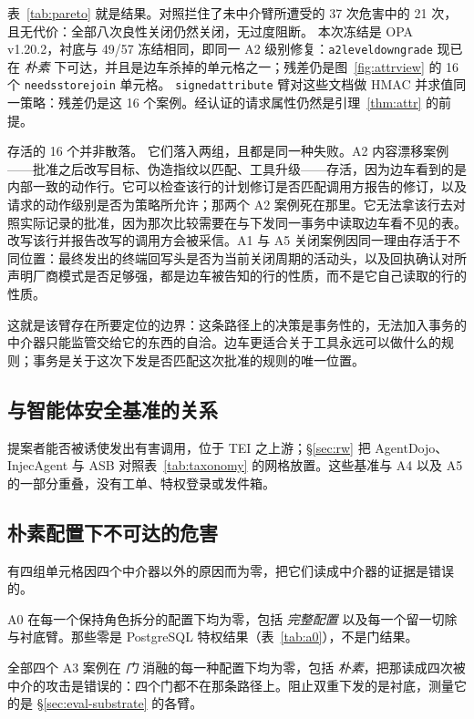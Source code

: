 \documentclass[acmsmall,manuscript,review,anonymous]{acmart}
\renewcommand{\_}{\discretionary{\textunderscore}{}{\textunderscore}}
\begin{document}
表~\ref{tab:pareto} 就是结果。对照拦住了未中介臂所遭受的 37 次危害中的 21 次，且无代价：全部八次良性关闭仍然关闭，无过度阻断。
本次冻结是 {OPA} v1.20.2，衬底与 49/57 冻结相同，即同一 {A2} 级别修复：\texttt{a2\_level\_downgrade} 现已在 \emph{朴素} 下可达，并且是边车杀掉的单元格之一；残差仍是图~\ref{fig:attrview} 的 16 个 \texttt{needs\_store\_join} 单元格。
\texttt{signed\_attribute} 臂对这些文档做 {HMAC} 并求值同一策略：残差仍是这 16 个案例。经认证的请求属性仍然是引理~\ref{thm:attr} 的前提。

存活的 16 个并非散落。
它们落入两组，且都是同一种失败。A2 内容漂移案例——批准之后改写目标、伪造指纹以匹配、工具升级——存活，因为边车看到的是内部一致的动作行。它可以检查该行的计划修订是否匹配调用方报告的修订，以及请求的动作级别是否为策略所允许；那两个 A2 案例死在那里。它无法拿该行去对照实际记录的批准，因为那次比较需要在与下发同一事务中读取边车看不见的表。改写该行并报告改写的调用方会被采信。A1 与 A5 关闭案例因同一理由存活于不同位置：最终发出的终端回写头是否为当前关闭周期的活动头，以及回执确认对所声明厂商模式是否足够强，都是边车被告知的行的性质，而不是它自己读取的行的性质。

这就是该臂存在所要定位的边界：这条路径上的决策是事务性的，无法加入事务的中介器只能监管交给它的东西的自洽。边车更适合关于工具永远可以做什么的规则；事务是关于这次下发是否匹配这次批准的规则的唯一位置。

\subsection{与智能体安全基准的关系}
\label{sec:eval-coverage}

提案者能否被诱使发出有害调用，位于 TEI 之上游；\S\ref{sec:rw} 把 AgentDojo、InjecAgent 与 ASB 对照表~\ref{tab:taxonomy} 的网格放置。这些基准与 A4 以及 A5 的一部分重叠，没有工单、特权登录或发件箱。

\subsection{朴素配置下不可达的危害}
\label{sec:eval-falsify}

有四组单元格因四个中介器以外的原因而为零，把它们读成中介器的证据是错误的。

A0 在每一个保持角色拆分的配置下均为零，包括 \emph{完整配置} 以及每一个留一切除与衬底臂。那些零是 {PostgreSQL} 特权结果（表~\ref{tab:a0}），不是门结果。

全部四个 A3 案例在 \emph{门} 消融的每一种配置下均为零，包括 \emph{朴素}，把那读成四次被中介的攻击是错误的：四个门都不在那条路径上。阻止双重下发的是衬底，测量它的是 \S\ref{sec:eval-substrate} 的各臂。
\end{document}

